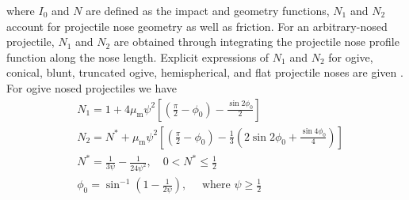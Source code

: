 \documentclass[]{article} %
\begin{document}
where $I_0$ and $N$ are defined as the impact and geometry functions, $N_1$ and $N_2$ account for projectile nose geometry as well as friction. For an arbitrary-nosed projectile, $N_1$ and $N_2$ are obtained through integrating the projectile nose profile function along the nose length. Explicit
expressions of $N_1$ and $N_2$ for ogive, conical, blunt, truncated ogive, hemispherical, and flat projectile noses are given \cite{chen2002deep}. For ogive nosed projectiles we have
\begin{equation}\nonumber
  \begin{aligned}
  & N_1=1+4 \mu_{\mathrm{m}} \psi^2\left[\left(\frac{\pi}{2}-\phi_0\right)-\frac{\sin 2 \phi_0}{2}\right] \\
  & N_2=N^*+\mu_{\mathrm{m}} \psi^2\left[\left(\frac{\pi}{2}-\phi_0\right)-\frac{1}{3}\left(2 \sin 2 \phi_0+\frac{\sin 4 \phi_0}{4}\right)\right] \\
  & N^*=\frac{1}{3 \psi}-\frac{1}{24 \psi^2}, \quad 0<N^* \leq \frac{1}{2} \\
  & \phi_0=\sin ^{-1}\left(1-\frac{1}{2 \psi}\right), \quad \text { where } \psi \geq \frac{1}{2}
  \end{aligned}
  \end{equation}
\end{document}
